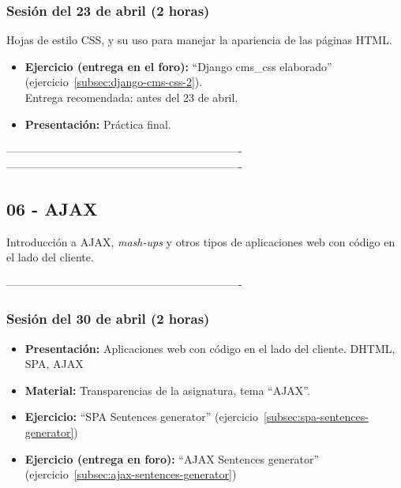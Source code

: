 \documentclass[a4paper,12pt]{article}
\begin{document}
\subsubsection{Sesión del 23 de abril (2 horas)}

Hojas de estilo CSS, y su uso para manejar la apariencia de las páginas HTML.

\begin{itemize}
\item \textbf{Ejercicio (entrega en el foro):} ``Django cms\_css elaborado'' (ejercicio~\ref{subsec:django-cms-css-2}). \\
Entrega recomendada: antes del 23 de abril.
\item \textbf{Presentación:} Práctica final.
\end{itemize}


----------------------------------------------------------------
----------------------------------------------------------------
\subsection{06 - AJAX}

Introducción a AJAX, \emph{mash-ups} y otros tipos de aplicaciones web con código en el lado del cliente.

----------------------------------------------------------------
\subsubsection{Sesión del 30 de abril (2 horas)}


\begin{itemize}
\item \textbf{Presentación:} Aplicaciones web con código en el lado del cliente. DHTML, SPA, AJAX
\item \textbf{Material:} Transparencias de la asignatura, tema ``AJAX''.
\item \textbf{Ejercicio:} ``SPA Sentences generator'' (ejercicio~\ref{subsec:spa-sentences-generator})
\item \textbf{Ejercicio (entrega en foro):} ``AJAX Sentences generator'' (ejercicio~\ref{subsec:ajax-sentences-generator})
\end{itemize}
\end{document}
